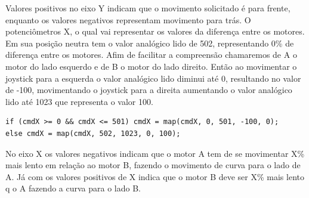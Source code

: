 \documentclass[a4paper,12pt,portuguese]{ufms-cpcx}
\begin{document}
Valores positivos no eixo Y indicam que o movimento solicitado é para frente, enquanto os valores negativos representam movimento para trás.
O potenciômetros X, o qual vai representar os valores da diferença entre os motores. Em sua posição neutra tem o valor analógico lido de 502, representando 0\% de diferença entre os motores. Afim de facilitar a compreensão chamaremos de A o motor do lado esquerdo e de B o motor do lado direito. Então ao movimentar o joystick para a esquerda o valor analógico lido diminui até 0, resultando no valor de -100, movimentando o joystick para a direita aumentando o valor analógico lido até 1023 que representa o valor 100. 
\begin{lstlisting}
if (cmdX >= 0 && cmdX <= 501) cmdX = map(cmdX, 0, 501, -100, 0);
else cmdX = map(cmdX, 502, 1023, 0, 100);
\end{lstlisting}
No eixo X os valores negativos indicam que o motor A tem de se movimentar X\% mais lento em relação ao motor B, fazendo o movimento de curva para o lado de A. Já com os valores positivos de X indica que o motor B deve ser X\% mais lento q o A fazendo a curva para o lado B.
\end{document}
